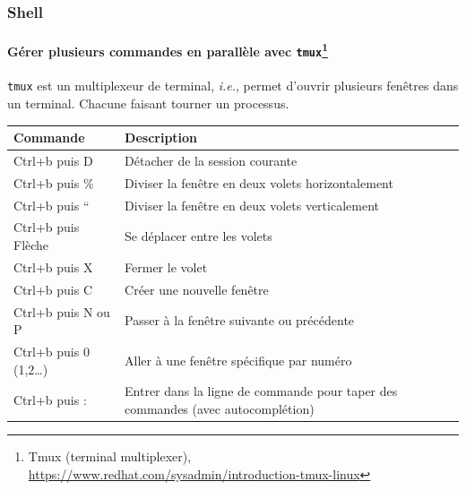 \documentclass{beamer}
\begin{document}
    \begin{frame}
        \transdissolve
        \frametitle{Shell}
        \framesubtitle{Gérer plusieurs commandes en parallèle avec \lstinline{tmux}\footnote{\label{tmux}Tmux (terminal multiplexer), \url{https://www.redhat.com/sysadmin/introduction-tmux-linux}}}
        \lstinline{tmux} est un multiplexeur de terminal, \textit{i.e.}, permet d'ouvrir plusieurs fenêtres dans un terminal.
        Chacune faisant tourner un processus.
        \begin{footnotesize}
            \begin{table}[ht]
                \centering
                \begin{tabular}{|p{3.5cm}|p{8cm}|}
                    \hline
                    \textbf{Commande}         & \textbf{Description}                                                            \\
                    \hline
                    Ctrl+b puis D             & Détacher de la session courante                                                 \\
                    \hline
                    Ctrl+b puis \%            & Diviser la fenêtre en deux volets horizontalement                               \\
                    \hline
                    Ctrl+b puis ``            & Diviser la fenêtre en deux volets verticalement                                 \\
                    \hline
                    Ctrl+b puis Flèche        & Se déplacer entre les volets                                                    \\
                    \hline
                    Ctrl+b puis X             & Fermer le volet                                                                 \\
                    \hline
                    Ctrl+b puis C             & Créer une nouvelle fenêtre                                                      \\
                    \hline
                    Ctrl+b puis N ou P        & Passer à la fenêtre suivante ou précédente                                      \\
                    \hline
                    Ctrl+b puis 0 (1,2\ldots) & Aller à une fenêtre spécifique par numéro                                       \\
                    \hline
                    Ctrl+b puis :             & Entrer dans la ligne de commande pour taper des commandes (avec autocomplétion) \\

\end{tabular}
\end{table}
\end{footnotesize}
\end{frame}
\end{document}
